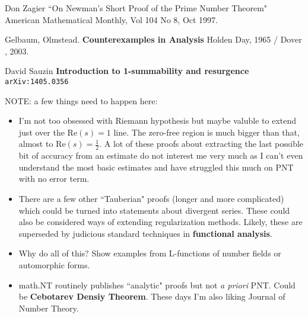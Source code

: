 \documentclass[12pt]{article}
\begin{document}
\begin{thebibliography}{}

\item Don Zagier ``On Newman's Short Proof of the Prime Number Theorem" American Mathematical Monthly, Vol 104 No 8, Oct 1997.

\item Gelbaum, Olmstead. \textbf{Counterexamples in Analysis} Holden Day, 1965 / Dover , 2003.

\item David Sauzin \textbf{Introduction to 1-summability and resurgence} \texttt{arXiv:1405.0356}

\end{thebibliography}

\newpage

\noindent NOTE: a few things need to happen here:
\begin{itemize}
\item I'm not too obsessed with Riemann hypothesis but maybe valuble to extend just over the $\mathrm{Re}(s) = 1$ line.  The zero-free region is much bigger than that, almost to $\mathrm{Re}(s) = \frac{1}{2}$.  A lot of these proofs about extracting the last possible bit of accuracy from an estimate do not interest me very much as I can't even understand the most basic estimates and have struggled this much on PNT with no error term.
\item There are a few other ``Tauberian" proofs (longer and more complicated) which could be turned into statements about divergent series.  These could also be considered ways of extending regularization methods.  Likely, these are superseded by judicious standard techniques in \textbf{functional analysis}.
\item Why do all of this?  Show examples from L-functions of number fields or automorphic forms. 
\item math.NT routinely publishes ``analytic" proofs but not \textit{a priori} PNT.  Could be \textbf{{C}ebotarev Densiy Theorem}.  These days I'm also liking Journal of Number Theory.
\end{itemize}
\end{document}
